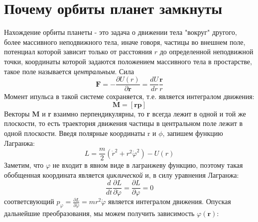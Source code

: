 \documentclass{article}
\date{}
\begin{document}
\pagestyle{fancy}


\section*{Почему орбиты планет замкнуты}

Нахождение орбиты планеты - это задача о движении тела "вокруг" другого, более массивного неподвижного тела, иначе говоря, частицы во внешнем поле, потенциал которой зависит только от расстояния $r$ до определенной неподвижной точки, координаты которой задаются положением массивного тела в простарстве, такое поле называется \textit{центральным}. Сила
\begin{equation}\label{eq1}
\textbf{F} = -\frac{\partial U(r)}{\partial\textbf{r}} = \frac{dU}{dr} \frac{\textbf{r}}{r}
\end{equation}  
Момент ипульса в такой системе сохраняется, т.е. является интегралом движения:
\begin{equation}\label{eq2}
\textbf{M} = [\textbf{rp}]
\end{equation}
Векторы \textbf{M} и \textbf{r} взаимно перпендикулярны, то \textbf{r} всегда лежит в одной и той же плоскости, то есть траектория движения частицы в центральном поле лежит в одной плоскости.
Введя полярные координаты r и $\phi$, запишем функцию Лагранжа:
\begin{equation}\label{eq3}
L = \frac{m}{2}\left(\dot{r}^2 + r^2 \dot{\varphi}^2\right) - U(r)
\end{equation}
Заметим, что $\varphi$ не входит в явном виде в лагранжеву функцию, поэтому такая обобщенная координата является \textit{циклической} и, в силу уравнения Лагранжа:
\begin{equation}\label{eq4}
\frac{d}{dt} \frac{\partial L}{\partial \dot{\varphi}} = \frac{\partial L}{\partial \varphi} = 0
\end{equation} 
 соответсвующий $p_\varphi = \frac{\partial L}{\partial \dot{\varphi}}= mr^2\dot{\varphi}$ является интегралом движения. Опуская дальнейшие преобразования, мы можем получить зависимость $\varphi(\textbf{r})$:
\end{document}
